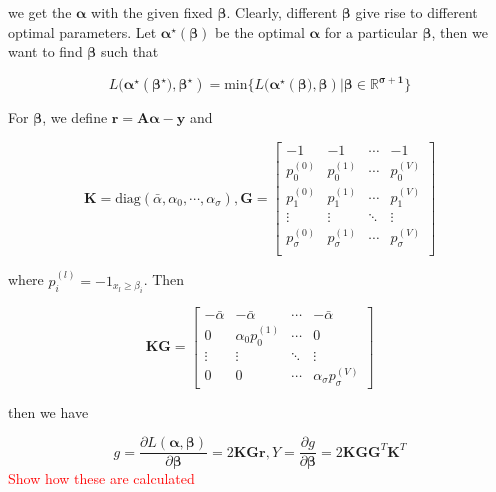 we get the $\boldsymbol{\alpha}$ with the given fixed $\boldsymbol{\beta}$. Clearly, different $\boldsymbol{\beta}$ give rise to different optimal parameters. Let $\boldsymbol{\alpha^\star}(\boldsymbol{\beta})$ be the optimal $\boldsymbol{\alpha}$ for a particular $\boldsymbol{\beta}$, then we want to find $\boldsymbol{\beta}$ such that


\begin{equation}
	L(\boldsymbol{\alpha^\star}(\boldsymbol{\beta^\star)}, \boldsymbol{\beta^\star})=\text{min}\{L(\boldsymbol{\alpha^\star}(\boldsymbol{\beta)}, \boldsymbol{\beta}) | \boldsymbol{\beta\in\mathbb{R}^{\sigma+1}}\}
\end{equation}

For $\boldsymbol{\beta}$, we define $\boldsymbol{r}=\boldsymbol{A\alpha-y}$ and 

$$
\boldsymbol{K}=\text{diag}(\bar{\alpha},\alpha_0, \cdots, \alpha_\sigma), \boldsymbol{G}=\begin{bmatrix}
 -1 & -1 & \cdots & -1 \\
  p_0^{(0)} & p_0^{(1)} & \cdots & p_0^{(V)} \\
  p_1^{(0)} & p_1^{(1)} & \cdots & p_1^{(V)} \\
  \vdots & \vdots & \ddots & \vdots \\
  p_\sigma^{(0)} & p_\sigma^{(1)}& \cdots & p_\sigma^{(V)} \\
\end{bmatrix}
$$

where $p_i^{(l)}=-1_{x_l\geq \beta_i}$. Then

$$
\boldsymbol{KG}=\begin{bmatrix}
 -\bar{\alpha} & -\bar{\alpha} & \cdots & -\bar{\alpha} \\
 0 & \alpha_0p_0^{(1)} & \cdots  & 0 \\
 \vdots & \vdots & \ddots & \vdots \\
 0 & 0 & \cdots & \alpha_\sigma p_\sigma^{(V)}
\end{bmatrix}
$$

then we have 

\begin{equation}
	g=\frac{\partial L(\boldsymbol{\alpha},\boldsymbol{\beta})}{\partial \boldsymbol{\beta}}=2\boldsymbol{KGr},
	Y=\frac{\partial g}{\partial \boldsymbol{\beta}}=2\boldsymbol{KGG}^T \boldsymbol{K}^T
\end{equation}
\textcolor{red}{Show how these are calculated}

